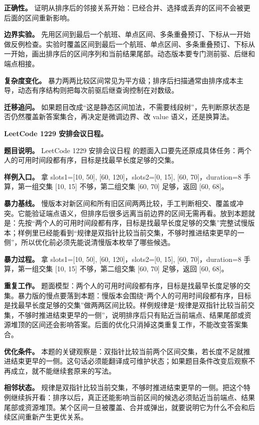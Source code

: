 \textbf{正确性。} 证明从排序后的邻接关系开始：已经合并、选择或丢弃的区间不会被更后面的区间重新影响。

\textbf{边界实验。} 先用区间到最后一个航班、单点区间、多条重叠预订、下标从一开始做反例检查。实验时覆盖区间到最后一个航班、单点区间、多条重叠预订、下标从一开始，画出排序后的区间序列和当前结果尾部。动态版本要专门测前驱、后继和端点相接。

\textbf{复杂度变化。} 暴力两两比较区间常见为平方级；排序后扫描通常由排序成本主导，动态有序结构则把每次前驱后继查询控制在对数级。

\textbf{迁移追问。} 如果题目改成“这是静态区间加法，不需要线段树”，先判断原状态是否仍然覆盖新答案集合，再决定是微调边界、改 value 语义，还是换算法。

\noindent\textbf{LeetCode 1229 安排会议日程。}

\textbf{题目说明。} LeetCode 1229 安排会议日程 的题面入口要先还原成具体任务：两个人的可用时间段都有序，目标是找最早长度足够的交集。

\textbf{样例入口。} 拿 slots1=[10, 50], [60, 120]，slots2=[0, 15], [60, 70]，duration=8 手算，第一组交集 [10, 15] 不够，第二组交集 [60, 70] 足够，返回 [60, 68]。

\textbf{暴力基线。} 慢版本对新区间和所有旧区间两两比较，手工判断相交、覆盖或冲突。它能验证端点语义，但排序后很多远离当前边界的区间无需再看。放到本题就是：先按“两个人的可用时间段都有序，目标是找最早长度足够的交集”完整试慢版本；样例里已经能看到“规律是双指针比较当前交集，不够时推进结束更早的一侧”，所以优化前必须先能说清慢版本枚举了哪些候选。

\textbf{暴力过程。} 拿 slots1=[10, 50], [60, 120]，slots2=[0, 15], [60, 70]，duration=8 手算，第一组交集 [10, 15] 不够，第二组交集 [60, 70] 足够，返回 [60, 68]。

\textbf{重复工作。} 题面模型：两个人的可用时间段都有序，目标是找最早长度足够的交集。暴力版的慢点要落到本题：慢版本会围绕“两个人的可用时间段都有序，目标是找最早长度足够的交集”做两两区间比较。样例规律是“规律是双指针比较当前交集，不够时推进结束更早的一侧”，说明排序后只有贴近当前端点、结果尾部或资源堆顶的区间还会影响答案。后面的优化只消掉这类重复工作，不能改变答案集合。

\textbf{优化条件。} 本题的关键观察是：双指针比较当前两个区间交集，若长度不足就推进结束更早的一侧。这句话必须能翻译成可维护状态；如果题目条件改变后观察不再成立，就不能继续套原来的写法。

\textbf{相邻状态。} 规律是双指针比较当前交集，不够时推进结束更早的一侧。把这个特例继续拆开看：排序以后，真正还能影响当前区间的候选必须贴近当前端点、结果尾部或资源堆顶。某个区间一旦被覆盖、合并或弹出，就要说明它为什么不会和后续区间重新产生更优关系。

